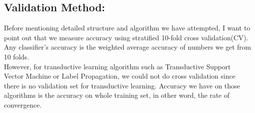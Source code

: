 \subsection{Validation Method:}
Before mentioning detailed structure and algorithm we have attempted, I want to point out that we measure accuracy using stratified 10-fold cross validation(CV). Any classifier's accuracy is the weighted average accuracy of numbers we get from 10 folds.  \\
\indent However, for transductive learning algorithm such as Transductive Support Vector Machine or Label Propagation, we could not do cross validation since there is no validation set for transductive learning. Accuracy we have on those algorithms is the accuracy on whole training set, in other word, the rate of convergence. 


